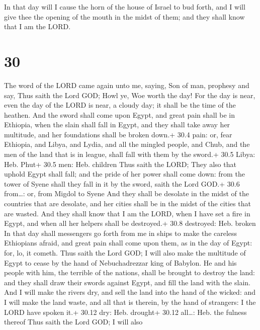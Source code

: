  In that day will I cause the horn of the house of Israel
to bud forth, and I will give thee the opening of the mouth in the midst
of them; and they shall know that I am the LORD.

\hypertarget{section-29}{%
\section{30}\label{section-29}}

 The word of the LORD came again unto me, saying,
 Son of man, prophesy and say, Thus saith the Lord GOD; Howl
ye, Woe worth the day!  For the day is near, even the day of
the LORD is near, a cloudy day; it shall be the time of the heathen.
 And the sword shall come upon Egypt, and great pain shall
be in Ethiopia, when the slain shall fall in Egypt, and they shall take
away her multitude, and her foundations shall be broken down.+ 30.4
pain: or, fear  Ethiopia, and Libya, and Lydia, and all the
mingled people, and Chub, and the men of the land that is in league,
shall fall with them by the sword.+ 30.5 Libya: Heb. Phut+ 30.5 men:
Heb. children  Thus saith the LORD; They also that uphold
Egypt shall fall; and the pride of her power shall come down: from the
tower of Syene shall they fall in it by the sword, saith the Lord GOD.+
30.6 from\ldots: or, from Migdol to Syene  And they shall be
desolate in the midst of the countries that are desolate, and her cities
shall be in the midst of the cities that are wasted.  And
they shall know that I am the LORD, when I have set a fire in Egypt, and
when all her helpers shall be destroyed.+ 30.8 destroyed: Heb. broken
 In that day shall messengers go forth from me in ships to
make the careless Ethiopians afraid, and great pain shall come upon
them, as in the day of Egypt: for, lo, it cometh.  Thus
saith the Lord GOD; I will also make the multitude of Egypt to cease by
the hand of Nebuchadrezzar king of Babylon.  He and his
people with him, the terrible of the nations, shall be brought to
destroy the land: and they shall draw their swords against Egypt, and
fill the land with the slain.  And I will make the rivers
dry, and sell the land into the hand of the wicked: and I will make the
land waste, and all that is therein, by the hand of strangers: I the
LORD have spoken it.+ 30.12 dry: Heb. drought+ 30.12 all\ldots: Heb. the
fulness thereof  Thus saith the Lord GOD; I will also
